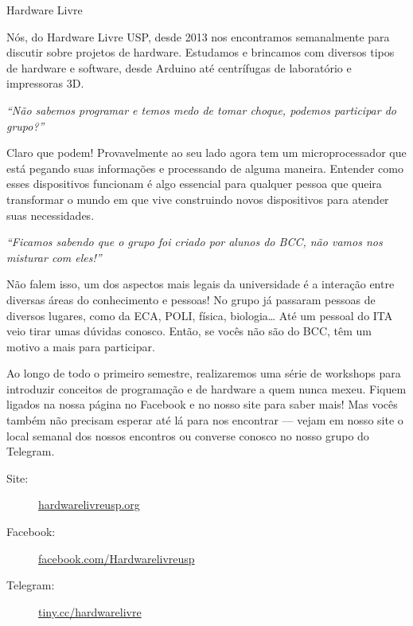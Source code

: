 \begin{subsecao}{Hardware Livre}


Nós, do Hardware Livre USP, desde 2013 nos encontramos semanalmente para
discutir sobre projetos de hardware. Estudamos e brincamos com diversos tipos de
hardware e software, desde Arduino até centrífugas de laboratório e impressoras
3D.

\textit{``Não sabemos programar e temos medo de tomar choque, podemos participar
do grupo?''}

Claro que podem! Provavelmente ao seu lado agora tem um microprocessador que
está pegando suas informações e processando de alguma maneira. Entender como
esses dispositivos funcionam é algo essencial para qualquer pessoa que queira
transformar o mundo em que vive construindo novos dispositivos para atender
suas necessidades.

\textit{``Ficamos sabendo que o grupo foi criado por alunos do BCC, não vamos
nos misturar com eles!''}

Não falem isso, um dos aspectos mais legais da universidade é a interação entre
diversas áreas do conhecimento e pessoas! No grupo já passaram pessoas de
diversos lugares, como da ECA, POLI, física, biologia… Até um pessoal do ITA
veio tirar umas dúvidas conosco. Então, se vocês não são do BCC, têm um motivo a
mais para participar.

Ao longo de todo o primeiro semestre, realizaremos uma série de workshops para
introduzir conceitos de programação e de hardware a quem nunca mexeu. Fiquem
ligados na nossa página no Facebook e no nosso site para saber mais! Mas vocês
também não precisam esperar até lá para nos encontrar — vejam em nosso site o
local semanal dos nossos encontros ou converse conosco no nosso grupo do
Telegram.

\begin{description}
  \item[Site:] \url{hardwarelivreusp.org}
  \item[Facebook:] \url{facebook.com/Hardwarelivreusp}
  \item[Telegram:] \url{tiny.cc/hardwarelivre}
\end{description}

\end{subsecao}
